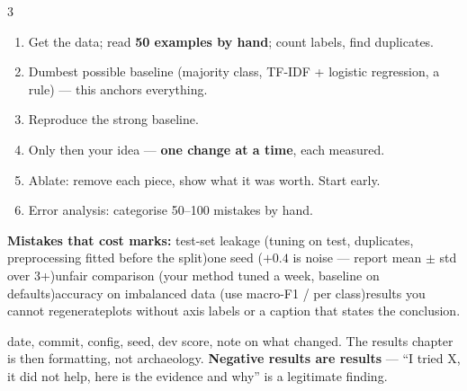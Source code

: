 \documentclass[10pt,a4paper]{article}
\begin{document}
\begin{multicols}{3}
\columnbreak
{}
\begin{enumerate}
  \item Get the data; read \textbf{50 examples by hand}; count labels, find
        duplicates.
  \item Dumbest possible baseline (majority class, TF-IDF + logistic
        regression, a rule) --- this anchors everything.
  \item Reproduce the strong baseline.
  \item Only then your idea --- \textbf{one change at a time}, each measured.
  \item Ablate: remove each piece, show what it was worth. Start early.
  \item Error analysis: categorise 50--100 mistakes by hand.
\end{enumerate}
\begin{flag}
\textbf{Mistakes that cost marks:} test-set leakage (tuning on test,
duplicates, preprocessing fitted before the split)\dt one seed ($+0.4$ is
noise --- report mean $\pm$ std over 3+)\dt unfair comparison (your method
tuned a week, baseline on defaults)\dt accuracy on imbalanced data (use
macro-F1 / per class)\dt results you cannot regenerate\dt plots without axis
labels or a caption that states the conclusion.
\end{flag}
date, commit, config, seed, dev score, note on
what changed. The results chapter is then formatting, not archaeology.
\textbf{Negative results are results} --- ``I tried X, it did not help, here is
the evidence and why'' is a legitimate finding.


\end{multicols}
\end{document}
